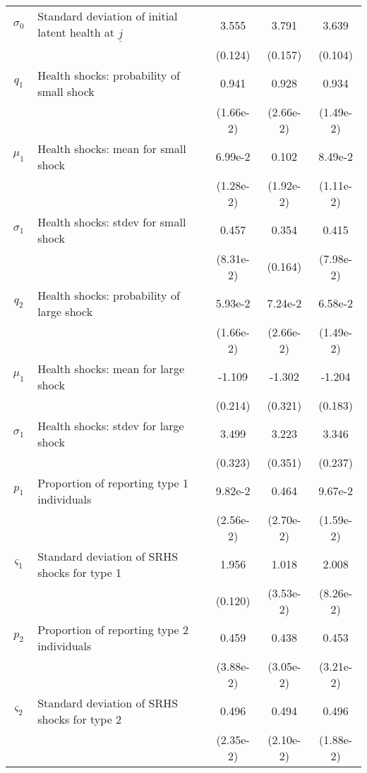 \begin{table}
\begin{center}
{\begin{tabular}{clccc}
\rule{0pt}{2.2ex}$\sigma_0$ & Standard deviation of initial latent health at $\underline{j}$ & 3.555 & 3.791 & 3.639 \\
\rule{0pt}{2.2ex} & & (0.124) & (0.157) & (0.104) \\
\rule{0pt}{2.2ex}$q_1$ & Health shocks: probability of small shock & 0.941 & 0.928 & 0.934 \\
\rule{0pt}{2.2ex} & & (1.66e-2) & (2.66e-2) & (1.49e-2) \\
\rule{0pt}{2.2ex}$\mu_1$ & Health shocks: mean for small shock & 6.99e-2 & 0.102 & 8.49e-2 \\
\rule{0pt}{2.2ex} & & (1.28e-2) & (1.92e-2) & (1.11e-2) \\
\rule{0pt}{2.2ex}$\sigma_1$ & Health shocks: stdev for small shock & 0.457 & 0.354 & 0.415 \\
\rule{0pt}{2.2ex} & & (8.31e-2) & (0.164) & (7.98e-2) \\
\rule{0pt}{2.2ex}$q_2$ & Health shocks: probability of large shock & 5.93e-2 & 7.24e-2 & 6.58e-2 \\
\rule{0pt}{2.2ex} & & (1.66e-2) & (2.66e-2) & (1.49e-2) \\
\rule{0pt}{2.2ex}$\mu_1$ & Health shocks: mean for large shock & -1.109 & -1.302 & -1.204 \\
\rule{0pt}{2.2ex} & & (0.214) & (0.321) & (0.183) \\
\rule{0pt}{2.2ex}$\sigma_1$ & Health shocks: stdev for large shock & 3.499 & 3.223 & 3.346 \\
\rule{0pt}{2.2ex} & & (0.323) & (0.351) & (0.237) \\
\hline
\rule{0pt}{2.2ex}$p_1$ & Proportion of reporting type 1 individuals & 9.82e-2 & 0.464 & 9.67e-2 \\
\rule{0pt}{2.2ex} & & (2.56e-2) & (2.70e-2) & (1.59e-2) \\
\rule{0pt}{2.2ex}$\varsigma_1$ & Standard deviation of SRHS shocks for type 1 & 1.956 & 1.018 & 2.008 \\
\rule{0pt}{2.2ex} & & (0.120) & (3.53e-2) & (8.26e-2) \\
\rule{0pt}{2.2ex}$p_2$ & Proportion of reporting type 2 individuals & 0.459 & 0.438 & 0.453 \\
\rule{0pt}{2.2ex} & & (3.88e-2) & (3.05e-2) & (3.21e-2) \\
\rule{0pt}{2.2ex}$\varsigma_2$ & Standard deviation of SRHS shocks for type 2 & 0.496 & 0.494 & 0.496 \\
\rule{0pt}{2.2ex} & & (2.35e-2) & (2.10e-2) & (1.88e-2) \\

\end{tabular}}
\end{center}
\end{table}
